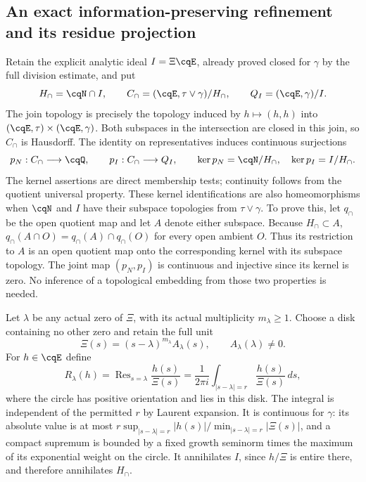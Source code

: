 \subsection{An exact information-preserving refinement and its residue projection}

Retain the explicit analytic ideal $I=\Xi\cqE$, already proved closed
for $\gamma$ by the full division estimate, and put
\begin{equation}
 H_\cap=\cqN\cap I,\qquad
 C_\cap=(\cqE,\tau\vee\gamma)/H_\cap,\qquad
 Q_I=(\cqE,\gamma)/I .
 \label{eq:cq-flow-meet-quotient}
\end{equation}
The join topology is precisely the topology induced by
$h\mapsto(h,h)$ into $(\cqE,\tau)\times(\cqE,\gamma)$.
Both subspaces in the intersection are closed in this join, so
$C_\cap$ is Hausdorff. The identity on representatives induces
continuous surjections
\begin{equation}
 p_N:C_\cap\longrightarrow\cqQ,\qquad
 p_I:C_\cap\longrightarrow Q_I,\qquad
 \ker p_N=\cqN/H_\cap,\quad
 \ker p_I=I/H_\cap .
 \label{eq:cq-flow-meet-maps}
\end{equation}
The kernel assertions are direct membership tests; continuity follows
from the quotient universal property. These kernel identifications
are also homeomorphisms when $\cqN$ and $I$ have their subspace
topologies from $\tau\vee\gamma$. To prove this, let $q_\cap$ be
the open quotient map and let $A$ denote either subspace.
Because $H_\cap\subset A$,
$q_\cap(A\cap O)=q_\cap(A)\cap q_\cap(O)$ for every open ambient
$O$. Thus its restriction to $A$ is an open quotient map onto
the corresponding kernel with its subspace topology.
The joint map $(p_N,p_I)$ is continuous and injective since its
kernel is zero. No inference of a topological embedding from those
two properties is needed.

Let $\lambda$ be any actual zero of $\Xi$, with its actual
multiplicity $m_\lambda\geq1$. Choose a disk containing no other zero
and retain the full unit
\[
 \Xi(s)=(s-\lambda)^{m_\lambda}A_\lambda(s),
 \qquad A_\lambda(\lambda)\ne0.
\]
For $h\in\cqE$ define
\begin{equation}
 R_\lambda(h)
 =\operatorname{Res}_{s=\lambda}\frac{h(s)}{\Xi(s)}
 =\frac1{2\pi i}\int_{|s-\lambda|=r}
                    \frac{h(s)}{\Xi(s)}\,ds ,
 \label{eq:cq-flow-residue-functional}
\end{equation}
where the circle has positive orientation and lies in this disk.
The integral is independent of the permitted $r$ by Laurent
expansion. It is continuous for $\gamma$: its absolute value is
at most $r\sup_{|s-\lambda|=r}|h(s)|/
\min_{|s-\lambda|=r}|\Xi(s)|$, and a compact supremum is bounded
by a fixed growth seminorm times the maximum of its exponential
weight on the circle. It annihilates $I$, since $h/\Xi$ is entire
there, and therefore annihilates $H_\cap$.

